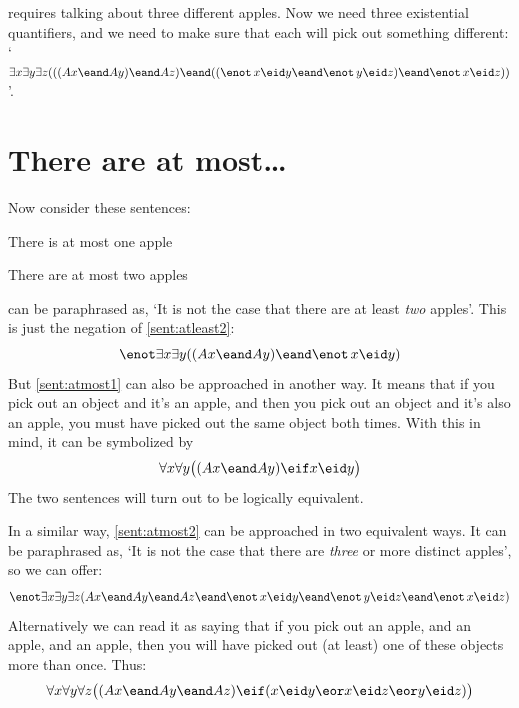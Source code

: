  requires talking about three different apples. Now we need three existential quantifiers, and we need to make sure that each will pick out something different: `$\exists x \exists y\exists z(((Ax \eand Ay) \eand Az) \eand ((\enot\, x\eid y \eand \enot\, y\eid z) \eand \enot\, x\eid z))$'.

\section{There are at most\ldots}
Now consider these sentences:
\begin{samplesent}
	\item\label{sent:atmost1} There is at most one apple
	\item\label{sent:atmost2} There are at most two apples
\end{samplesent}
 can be paraphrased as, `It is not the case that there are at least \emph{two} apples'. This is just the negation of \cref{sent:atleast2}:
$$\enot \exists x \exists y((Ax \eand Ay) \eand \enot\, x\eid y)$$
But \cref{sent:atmost1} can also be approached in another way. It means that if you pick out an object and it's an apple, and then you pick out an object and it's also an apple, you must have picked out the same object both times. With this in mind, it can be symbolized by
$$\forall x\forall y\bigl((Ax \eand Ay) \eif x\eid y\bigr)$$
The two sentences will turn out to be logically equivalent.

In a similar way, \cref{sent:atmost2} can be approached in two equivalent ways. It can be paraphrased as, `It is not the case that there are \emph{three} or more distinct apples', so we can offer:
$$\enot \exists x \exists y\exists z(Ax \eand Ay \eand Az \eand \enot\, x\eid y \eand \enot\, y\eid z \eand \enot\, x\eid z)$$
Alternatively we can read it as saying that if you pick out an apple, and an apple, and an apple, then you will have picked out (at least) one of these objects more than once. Thus:
$$\forall x\forall y\forall z\bigl((Ax \eand Ay \eand Az) \eif (x\eid y \eor x\eid z \eor y\eid z)\bigr)$$


